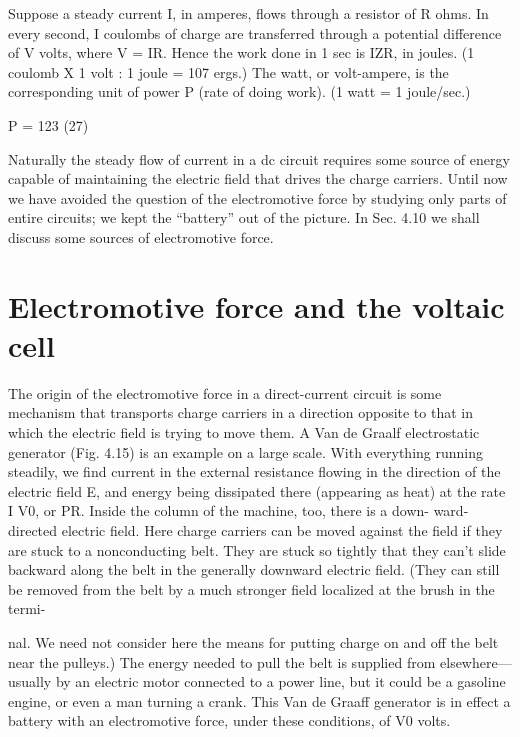 Suppose a steady current I, in amperes, flows through a resistor
of R ohms. In every second, I coulombs of charge are transferred
through a potential difference of V volts, where V = IR. Hence the
work done in 1 sec is IZR, in joules. (1 coulomb X 1 volt : 1 joule =
107 ergs.) The watt, or volt-ampere, is the corresponding unit of
power P (rate of doing work). (1 watt = 1 joule/sec.)

P = 123 (27)
\begin{equation}
\end{equation}

Naturally the steady flow of current in a dc circuit requires some
source of energy capable of maintaining the electric field that drives
the charge carriers. Until now we have avoided the question of the
electromotive force by studying only parts of entire circuits; we kept
the ``battery'' out of the picture. In Sec. 4.10 we shall discuss some
sources of electromotive force.

\section{Electromotive force and the voltaic cell}

The origin of the electromotive force in a direct-current circuit is
some mechanism that transports charge carriers in a direction opposite
to that in which the electric field is trying to move them.
A Van de Graalf electrostatic generator (Fig. 4.15) is an example on
a large scale. With everything running steadily, we find current in
the external resistance flowing in the direction of the electric field E,
and energy being dissipated there (appearing as heat) at the rate
I V0, or PR. Inside the column of the machine, too, there is a down-
ward-directed electric field. Here charge carriers can be moved
against the field if they are stuck to a nonconducting belt. They are
stuck so tightly that they can't slide backward along the belt in the
generally downward electric field. (They can still be removed from
the belt by a much stronger field localized at the brush in the termi-

nal. We need not consider here the means for putting charge on and
off the belt near the pulleys.) The energy needed to pull the belt is
supplied from elsewhere---usually by an electric motor connected to
a power line, but it could be a gasoline engine, or even a man turning
a crank. This Van de Graaff generator is in effect a battery with an
electromotive force, under these conditions, of V0 volts.

